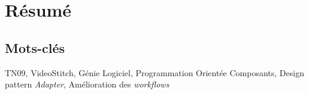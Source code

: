 \section*{Résumé}
\begin{abstract}
...
\end{abstract}

\subsection*{Mots-clés}
TN09, VideoStitch, Génie Logiciel, Programmation Orientée Composants, 
Design pattern \textit{Adapter}, Amélioration des \textit{workflows}
